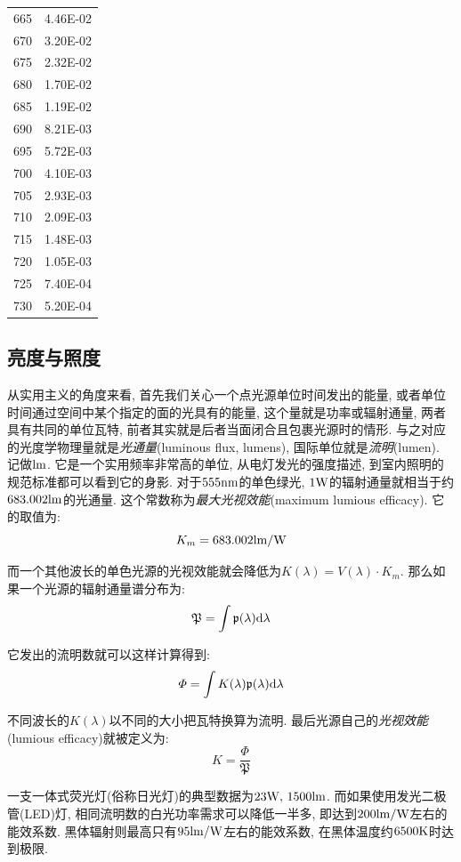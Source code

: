\begin{table}[H]
\begin{minipage}{0.19\textwidth}
\begin{tabular}{cc}
665 & 4.46E-02 \\
670 & 3.20E-02 \\
675 & 2.32E-02 \\
680 & 1.70E-02 \\
685 & 1.19E-02 \\
690 & 8.21E-03 \\
695 & 5.72E-03 \\
700 & 4.10E-03 \\
705 & 2.93E-03 \\
710 & 2.09E-03 \\
715 & 1.48E-03 \\
720 & 1.05E-03 \\
725 & 7.40E-04 \\
730 & 5.20E-04 \\
\bottomrule
\end{tabular}
\end{minipage}
\hfil
\end{table}


\subsection{亮度与照度}

从实用主义的角度来看, 首先我们关心一个点光源单位时间发出的能量, 或者单位时间通过空间中某个指定的面的光具有的能量, 这个量就是功率或辐射通量, 两者具有共同的单位瓦特, 前者其实就是后者当面闭合且包裹光源时的情形. 与之对应的光度学物理量就是\emph{光通量}(luminous flux, lumens), 国际单位就是\emph{流明}(lumen). 记做${\rm lm}$. 它是一个实用频率非常高的单位, 从电灯发光的强度描述, 到室内照明的规范标准都可以看到它的身影. 对于$555{\rm nm}$的单色绿光, $1{\rm W}$的辐射通量就相当于约$683.002{\rm lm}$的光通量. 这个常数称为\emph{最大光视效能}(maximum lumious efficacy). 它的取值为:
\[K_m=683.002 {\rm lm/W}\]

而一个其他波长的单色光源的光视效能就会降低为$K(\lambda)=V(\lambda)\cdot K_m$. 那么如果一个光源的辐射通量谱分布为:
\[\mathfrak{P}=\int \mathfrak{p}(\lambda)\textrm{d} \lambda\]

它发出的流明数就可以这样计算得到:
\[\varPhi=\int K(\lambda)\mathfrak{p}(\lambda)\textrm{d} \lambda\]

不同波长的$K(\lambda)$以不同的大小把瓦特换算为流明. 最后光源自己的\emph{光视效能}(lumious efficacy)就被定义为:
\[K=\frac{\varPhi}{\mathfrak{P}}\]

一支一体式荧光灯(俗称日光灯)的典型数据为$23{\rm W},\,1500{\rm lm}$. 而如果使用发光二极管(LED)灯, 相同流明数的白光功率需求可以降低一半多, 即达到$200{\rm lm/W}$左右的能效系数. 黑体辐射则最高只有$95{\rm lm/W}$左右的能效系数, 在黑体温度约$6500{\rm K}$时达到极限.

